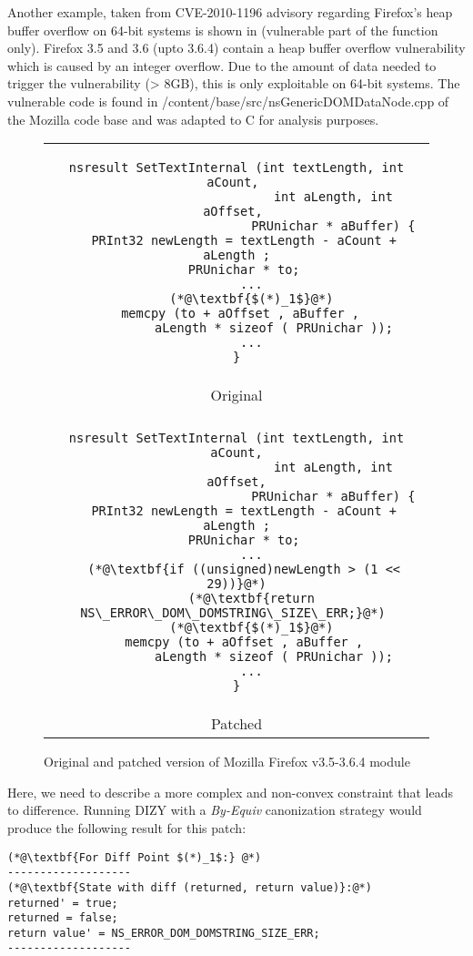 Another example, taken from CVE-2010-1196 advisory regarding Firefox's heap buffer overflow on 64-bit systems is shown in  (vulnerable part of the function only). Firefox 3.5 and 3.6 (upto 3.6.4) contain a heap buffer overflow vulnerability which is caused by an integer overflow. Due to the amount of data needed to trigger the vulnerability (> 8GB), this is only exploitable on 64-bit systems. The vulnerable code is found in /content/base/src/nsGenericDOMDataNode.cpp
of the Mozilla code base and was adapted to C for analysis purposes.
\begin{figure}
\centering
\begin{tabular}{c}
\begin{lstlisting}
nsresult SetTextInternal (int textLength, int aCount, 
                          int aLength, int aOffset, 
                          PRUnichar * aBuffer) {
  PRInt32 newLength = textLength - aCount + aLength ;
  PRUnichar * to;
    ...
    (*@\textbf{$(*)_1$}@*)
  memcpy (to + aOffset , aBuffer , 
          aLength * sizeof ( PRUnichar ));
    ...
}
\end{lstlisting}
\\
Original
\\
\hline
\\
\begin{lstlisting}
nsresult SetTextInternal (int textLength, int aCount,
                          int aLength, int aOffset,
                          PRUnichar * aBuffer) {
  PRInt32 newLength = textLength - aCount + aLength ;
  PRUnichar * to;
    ...
  (*@\textbf{if ((unsigned)newLength > (1 << 29))}@*)
    (*@\textbf{return NS\_ERROR\_DOM\_DOMSTRING\_SIZE\_ERR;}@*) 
    (*@\textbf{$(*)_1$}@*)
  memcpy (to + aOffset , aBuffer ,
          aLength * sizeof ( PRUnichar ));
    ...
}
\end{lstlisting}
\\
Patched
\end{tabular}
\caption{Original and patched version of Mozilla Firefox  v3.5-3.6.4 module}
\end{figure}
Here, we need to describe a more complex and non-convex constraint that leads to difference. Running DIZY with a \emph{By-Equiv} canonization strategy would produce the following result for this patch:
\begin{lstlisting}
(*@\textbf{For Diff Point $(*)_1$:} @*)
-------------------
(*@\textbf{State with diff (returned, return value)}:@*)
returned' = true;
returned = false;
return value' = NS_ERROR_DOM_DOMSTRING_SIZE_ERR;
-------------------
\end{lstlisting}
